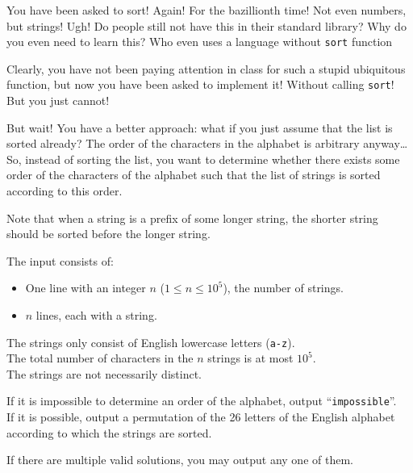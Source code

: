 

\newcommand{\maxn}{10^5}
\newcommand{\maxs}{10^5}

You have been asked to sort! Again! For the bazillionth time!
Not even numbers, but strings! Ugh!
Do people still not have this in their standard library?
Why do you even need to learn this?
Who even uses a language without \texttt{sort} function\textinterrobang

Clearly, you have not been paying attention in class for such a stupid ubiquitous function,
but now you have been asked to implement it!
Without calling \texttt{sort}! But you just cannot!

But wait!
You have a better approach:
what if you just assume that the list is sorted already?
The order of the characters in the alphabet is arbitrary anyway\ldots{}
So, instead of sorting the list,
you want to determine whether there exists some order of the characters of the alphabet
such that the list of strings is sorted according to this order.

Note that when a string is a prefix of some longer string, the shorter string
should be sorted before the longer string.

\begin{Input}
    The input consists of:
    \begin{itemize}
        \item One line with an integer $n$ ($1\leq n\leq \maxn$), the number of strings.
        \item $n$ lines, each with a string.
    \end{itemize}
    The strings only consist of English lowercase letters (\texttt{a-z}). \\
    The total number of characters in the $n$ strings is at most $\maxs$. \\
    The strings are not necessarily distinct.
\end{Input}

\begin{Output}
    If it is impossible to determine an order of the alphabet, output ``\texttt{impossible}''. \\
    If it is possible, output a permutation of the 26 letters of the English alphabet
    according to which the strings are sorted.

    If there are multiple valid solutions, you may output any one of them.
\end{Output}
